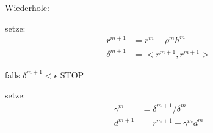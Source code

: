 \begin{itemize}
\begin{item}{Wiederhole:}
\begin{itemize}
\begin{item}{setze:}
\begin{align*}
				r^{m+1} &= r^m - \rho^m h^m \\
				\delta^{m+1} &= < r^{m+1} , r^{m+1} >
			\end{align*}
		\end{item} 
		\begin{item}
			{falls $\delta^{m+1} < \epsilon $ STOP}
		\end{item} 
		\begin{item}{setze:}
			\begin{align*}
				\gamma^m &= \delta^{m+1} / \delta^m \\
				d^{m+1} &= r^{m+1} + \gamma^m d^m
			\end{align*}
		\end{item}
	\end{itemize}
\end{item}
\end{itemize}







